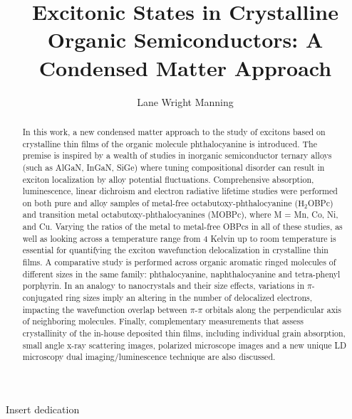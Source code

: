\documentclass[12pt]{report}
\title{Excitonic States in Crystalline Organic Semiconductors: A Condensed Matter Approach}
\author{Lane Wright Manning}
\begin{document}
\maketitle
{}

\begin{abstract}
	
\vspace{10mm}
In this work, a new condensed matter approach to the study of excitons based on crystalline thin films of the organic molecule phthalocyanine is introduced.  The premise is inspired by a wealth of studies in inorganic semiconductor ternary alloys (such as AlGaN, InGaN, SiGe) where tuning compositional disorder can result in exciton localization by alloy potential fluctuations.  Comprehensive absorption, luminescence, linear dichroism and electron radiative lifetime studies were performed on both pure and alloy samples of metal-free octabutoxy-phthalocyanine ($\mathrm{H_{2}}$OBPc) and transition metal octabutoxy-phthalocyanines (MOBPc), where M = Mn, Co, Ni, and Cu.  Varying the ratios of the metal to metal-free OBPcs in all of these studies, as well as looking across a temperature range from 4 Kelvin up to room temperature is essential for quantifying the exciton wavefunction delocalization in crystalline thin films.  A comparative study is performed across organic aromatic ringed molecules of different sizes in the same family: phthalocyanine, naphthalocyanine and tetra-phenyl porphyrin.  In an analogy to nanocrystals and their size effects, variations in $\pi$-conjugated ring sizes imply an altering in the number of delocalized electrons, impacting the wavefunction overlap between $\pi$-$\pi$ orbitals along the perpendicular axis of neighboring molecules.  Finally, complementary measurements that assess crystallinity of the in-house deposited thin films, including individual grain absorption, small angle x-ray scattering images, polarized microscope images and a new unique LD microscopy dual imaging/luminescence technique are also discussed.


\end{abstract}

\begin{dedication}
	
	
\end{dedication}

\begin{acknowledgements}

  Insert dedication

\end{acknowledgements}

\newpage

\tableofcontents
\newpage


\listoffigures
\newpage

\listoftables
\newpage

\doublespacing









\newpage



\end{document}
